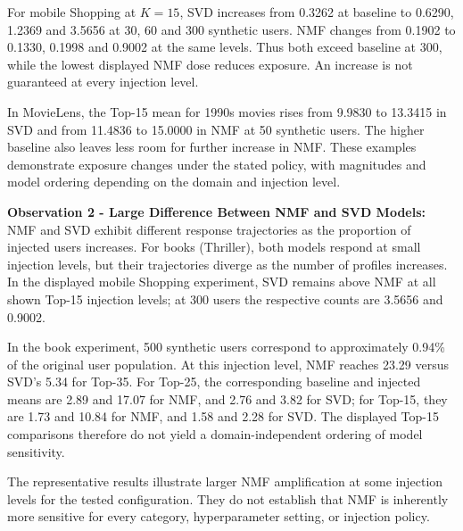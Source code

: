\documentclass[information,article,submit,pdftex,moreauthors]{Definitions/mdpi}
\newif\ifrevisionnotes
\newcommand{\saracomment}[1]{\ifrevisionnotes\par\smallskip\noindent\textcolor{orange}{\textbf{Sara:} #1}\par\smallskip\fi}
\begin{document}
\saracomment{Updated the book example to 500 synthetic users using the verified PerturbRec summary table. Observation 1 now uses Top-15, matching the displayed exposure figure: NMF 1.73 to 10.84 and SVD 1.58 to 2.28. Exposure percentages are calculated before rounding.}

For mobile Shopping at $K=15$, SVD increases from 0.3262 at baseline to 0.6290, 1.2369 and 3.5656 at 30, 60 and 300 synthetic users. NMF changes from 0.1902 to 0.1330, 0.1998 and 0.9002 at the same levels. Thus both exceed baseline at 300, while the lowest displayed NMF dose reduces exposure. An increase is not guaranteed at every injection level.

In MovieLens, the Top-15 mean for 1990s movies rises from 9.9830 to 13.3415 in SVD and from 11.4836 to 15.0000 in NMF at 50 synthetic users. The higher baseline also leaves less room for further increase in NMF. These examples demonstrate exposure changes under the stated policy, with magnitudes and model ordering depending on the domain and injection level.

{\bf Observation 2 - Large Difference Between NMF and SVD Models:}
NMF and SVD exhibit different response trajectories as the proportion of injected users increases. For books (Thriller), both models respond at small injection levels, but their trajectories diverge as the number of profiles increases. In the displayed mobile Shopping experiment, SVD remains above NMF at all shown Top-15 injection levels; at 300 users the respective counts are 3.5656 and 0.9002.

In the book experiment, 500 synthetic users correspond to approximately 0.94\% of the original user population. At this injection level, NMF reaches 23.29 versus SVD's 5.34 for Top-35. For Top-25, the corresponding baseline and injected means are 2.89 and 17.07 for NMF, and 2.76 and 3.82 for SVD; for Top-15, they are 1.73 and 10.84 for NMF, and 1.58 and 2.28 for SVD. The displayed Top-15 comparisons therefore do not yield a domain-independent ordering of model sensitivity.

The representative results illustrate larger NMF amplification at some injection levels for the tested configuration. They do not establish that NMF is inherently more sensitive for every category, hyperparameter setting, or injection policy.

\saracomment{Retained Observations 1 and 2 and verified that all book examples use 500 synthetic users for the three list lengths. Moved the non-monotonic dose-response observation to Future Work. Mobile injection counts remain dataset-specific.}
\end{document}
